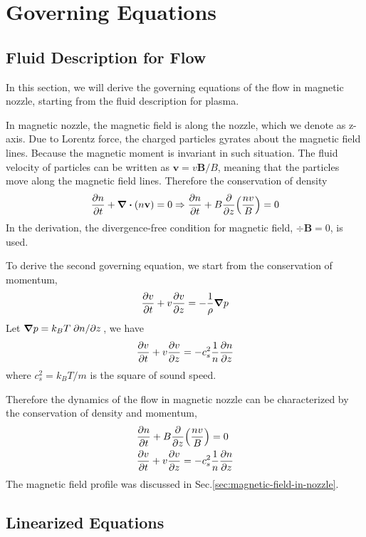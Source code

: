 \chapter{Governing Equations} \label{chap:governing-equations}
\section{Fluid Description for Flow}
In this section, we will derive the governing equations of the flow in magnetic nozzle, starting from the fluid description for plasma.

In magnetic nozzle, the magnetic field is along the nozzle, which we denote as z-axis. Due to Lorentz force, the charged particles gyrates about the magnetic field lines. Because the magnetic moment is invariant in such situation. \cite{chen_introduction_2016} The fluid velocity of particles can be written as $\mathbf{v} = v\mathbf{B}/B$, meaning that the particles move along the magnetic field lines. Therefore the conservation of density 
\[ 
\pdv{n}{t} + \div(n\mathbf{v}) = 0 
\Rightarrow 
\pdv{n}{t} + B\pdv{z}(\frac{nv}{B}) = 0  
\]
In the derivation, the divergence-free condition for magnetic field, $\div{\mathbf{B}} = 0$, is used.

To derive the second governing equation, we start from the conservation of momentum, 
\[ \pdv{v}{t} + v\pdv{v}{z} = -\frac{1}{\rho}\grad{p} \]
Let $\grad{p} = k_BT\pdv*{n}{z}$, we have
\[ \pdv{v}{t} + v\pdv{v}{z} = -c_s^2\frac{1}{n}\pdv{n}{z} \]
where $c_s^2 = k_BT/m$ is the square of sound speed.

Therefore the dynamics of the flow in magnetic nozzle can be characterized by the conservation of density and momentum,
\begin{align*}
	&\pdv{n}{t} + B\pdv{z}(\frac{nv}{B}) = 0\\
	&\pdv{v}{t} + v\pdv{v}{z} = -c_s^2\frac{1}{n}\pdv{n}{z}
\end{align*}
The magnetic field profile was discussed in Sec.\ref{sec:magnetic-field-in-nozzle}.

\section{Linearized Equations}
